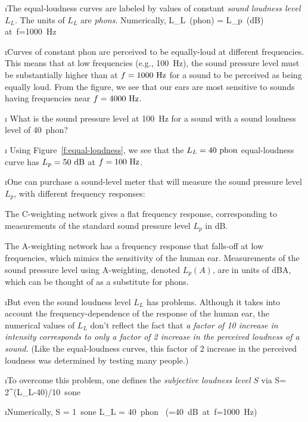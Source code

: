 \i The equal-loudness curves are labeled by values of
constant {\em sound loudness level} $L_L$.
The units of $L_L$ are {\em phons}.
Numerically, 
%
\be
L_L\ ({\rm phon}) = L_p\ ({\rm dB})
\quad
{\rm at}\  f=1000~{\rm Hz}
\ee

\i Curves of constant phon are perceived to be 
equally-loud at different frequencies.
This means that at low frequencies (e.g., 100~Hz), 
the sound pressure
level must be substantially higher than at 
$f=1000~{\rm Hz}$ for a sound to be perceived as being
equally loud.
From the figure, we see that our ears are most sensitive 
to sounds having frequencies near $f=4000~{\rm Hz}$.

\i \exer 
What is the sound pressure level at 100~Hz for a 
sound with a sound loudness level of 40~phon?

\i \ans 
Using Figure~\ref{f:equal-loudness}, we see that
the $L_L=40~{\rm phon}$ equal-loudness curve has
$L_p=50~{\rm dB}$ at $f=100~{\rm Hz}$.

\i One can purchase a sound-level meter that will
measure the sound pressure level $L_p$, with 
different frequency responses:

The C-weighting network gives a flat frequency response,
corresponding to measurements of the standard sound 
pressure level $L_p$ in dB.

The A-weighting network has a frequency response that
falls-off at low frequencies, which mimics the sensitivity 
of the human ear.
Measurements of the sound pressure level using A-weighting, 
denoted $L_p(A)$, are in units of dBA, which can 
be thought of as a substitute for phons.

\i But even the sound loudness level $L_L$ has problems.
Although it takes into account the frequency-dependence
of the response of the human ear, the numerical values
of $L_L$ don't reflect the fact that 
{\em a factor of 10 
increase in intensity corresponds to only a factor of 
2 increase in the perceived loudness of a sound.}
(Like the equal-loudness curves, this factor of 2 
increase in the perceived loudness was determined by
testing many people.)

\i To overcome this problem, one defines the 
{\em subjective loudness level} $S$ via
%
\be
S= \, 2^{(L_L-40)/10}~{\rm sone}
\ee

\i Numerically,
%
\be S = 1~{\rm sone} 
\quad\Leftrightarrow\quad
L_L = 40~{\rm phon} 
\ (=40~{\rm dB\ at}\ f=1000~{\rm Hz})
\ee

